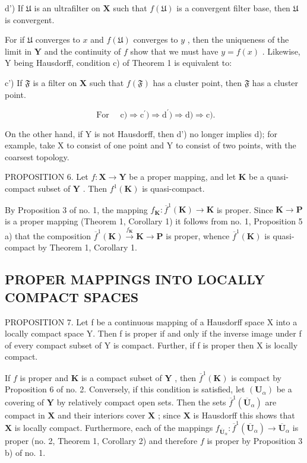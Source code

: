 d') If \(\mathfrak{U}\) is an ultrafilter on \(\mathbf{X}\) such that \(f(\mathfrak{U})\) is a convergent filter base, then \(\mathfrak{U}\) is convergent.

For if \(\mathfrak{U}\) converges to \(x\) and \(f(\mathfrak{U})\) converges to \(y\) , then the uniqueness of the limit in \(\mathbf{Y}\) and the continuity of \(f\) show that we must have \(y = f(x)\) . Likewise, Y being Hausdorff, condition c) of Theorem 1 is equivalent to:

c') If \(\mathfrak{F}\) is a filter on \(\mathbf{X}\) such that \(f(\mathfrak{F})\) has a cluster point, then \(\mathfrak{F}\) has a cluster point.

\[
\text { For } \quad \mathrm{c}) \Longrightarrow \mathrm{c} ^ {\prime}) \Longrightarrow \mathrm{d} ^ {\prime}) \Longrightarrow \mathrm{d}) \Longrightarrow \mathrm{c}).
\]

On the other hand, if Y is not Hausdorff, then d') no longer implies d); for example, take X to consist of one point and Y to consist of two points, with the coarsest topology.

PROPOSITION 6. Let \(f: \mathbf{X} \to \mathbf{Y}\) be a proper mapping, and let \(\mathbf{K}\) be a quasi-compact subset of \(\mathbf{Y}\) . Then \(f^1(\mathbf{K})\) is quasi-compact.

By Proposition 3 of no. 1, the mapping \(f_{\mathbf{K}}: \overline{f}^{1}(\mathbf{K}) \to \mathbf{K}\) is proper. Since \(\mathbf{K} \to \mathbf{P}\) is a proper mapping (Theorem 1, Corollary 1) it follows from no. 1, Proposition 5 a) that the composition \(\overline{f}^{1}(\mathbf{K}) \xrightarrow{f_{\mathbf{K}}} \mathbf{K} \to \mathbf{P}\) is proper, whence \(\overline{f}^{1}(\mathbf{K})\) is quasi-compact by Theorem 1, Corollary 1.

\subsection{PROPER MAPPINGS INTO LOCALLY COMPACT SPACES}

PROPOSITION 7. Let f be a continuous mapping of a Hausdorff space X into a locally compact space Y. Then f is proper if and only if the inverse image under f of every compact subset of Y is compact. Further, if f is proper then X is locally compact.

If \(f\) is proper and \(\mathbf{K}\) is a compact subset of \(\mathbf{Y}\) , then \(\overline{f}^{1}(\mathbf{K})\) is compact by Proposition 6 of no. 2. Conversely, if this condition is satisfied, let \((\mathbf{U}_{\alpha})\) be a covering of \(\mathbf{Y}\) by relatively compact open sets. Then the sets \(\overline{f}^{1}(\overline{\mathbf{U}}_{\alpha})\) are compact in \(\mathbf{X}\) and their interiors cover \(\mathbf{X}\) ; since \(\mathbf{X}\) is Hausdorff this shows that \(\mathbf{X}\) is locally compact. Furthermore, each of the mappings \(f_{\overline{\mathbf{U}}_{\alpha}}: \overline{f}^{1}(\overline{\mathbf{U}}_{\alpha}) \to \overline{\mathbf{U}}_{\alpha}\) is proper (no. 2, Theorem 1, Corollary 2) and therefore \(f\) is proper by Proposition 3 b) of no. 1.

